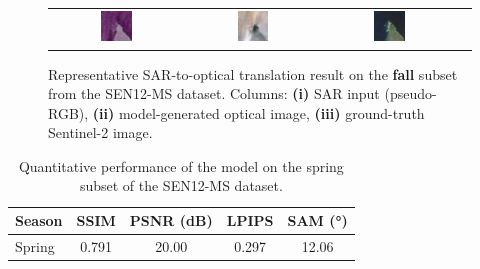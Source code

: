 \begin{figure}[h!]
\begin{tabular}{c *{3}{c}}
        \includegraphics[width=0.25\textwidth]{img/seasons/fall/sample_000015_sar_pseudo.png} &
        \includegraphics[width=0.25\textwidth]{img/seasons/fall/sample_000015_pred_rgb.png} &
        \includegraphics[width=0.25\textwidth]{img/seasons/fall/sample_000015_true_rgb.png} \\

    \end{tabular}
    \caption[Qualitative results on the fall subset]{%
    Representative SAR-to-optical translation result on the \textbf{fall} subset from the SEN12-MS dataset. 
    Columns: \textbf{(i)} SAR input (pseudo-RGB), 
    \textbf{(ii)} model-generated optical image, 
    \textbf{(iii)} ground-truth Sentinel-2 image.
    }
    \label{fig:appendix_fall}
\end{figure}

\newpage
\vspace{2em} 

\begin{table}[h!]
\centering
\caption[Quantitative results on the spring subset]{Quantitative performance of the model on the spring subset of the SEN12-MS dataset.}
\begin{tabular}{lcccc}
\toprule
\textbf{Season} & \textbf{SSIM} & \textbf{PSNR (dB)} & \textbf{LPIPS} & \textbf{SAM (°)} \\
\midrule
Spring & 0.791 & 20.00 & 0.297 & 12.06 \\
\bottomrule
\end{tabular}
\label{tab:spring_results}
\end{table}
\vspace{2em} 



